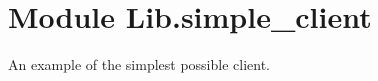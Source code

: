 %
%
%


\section{Module Lib.simple\_client}

    \label{Lib:simple_client}
An example of the simplest possible client.


